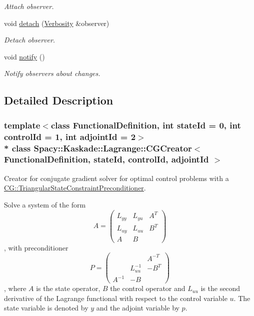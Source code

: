 \begin{DoxyCompactItemize}
\begin{DoxyCompactList}\small\item\em Attach observer. \end{DoxyCompactList}\item 
void \hyperlink{classSpacy_1_1Mixin_1_1MixinConnection_adda739590c487679c26f60e50aedb73f}{detach} (\hyperlink{classSpacy_1_1Mixin_1_1Verbosity_aefe2f237b0456c4bced001fbfa75f92e}{Verbosity} \&observer)\hypertarget{classSpacy_1_1Mixin_1_1MixinConnection_adda739590c487679c26f60e50aedb73f}{}\label{classSpacy_1_1Mixin_1_1MixinConnection_adda739590c487679c26f60e50aedb73f}

\begin{DoxyCompactList}\small\item\em Detach observer. \end{DoxyCompactList}\item 
void \hyperlink{classSpacy_1_1Mixin_1_1MixinConnection_a1ddeaa78a3bb4a38c2cca36d1f99fe36}{notify} ()\hypertarget{classSpacy_1_1Mixin_1_1MixinConnection_a1ddeaa78a3bb4a38c2cca36d1f99fe36}{}\label{classSpacy_1_1Mixin_1_1MixinConnection_a1ddeaa78a3bb4a38c2cca36d1f99fe36}

\begin{DoxyCompactList}\small\item\em Notify observers about changes. \end{DoxyCompactList}\end{DoxyCompactItemize}


\subsection{Detailed Description}
\subsubsection*{template$<$class Functional\+Definition, int state\+Id = 0, int control\+Id = 1, int adjoint\+Id = 2$>$\\*
class Spacy\+::\+Kaskade\+::\+Lagrange\+::\+C\+G\+Creator$<$ Functional\+Definition, state\+Id, control\+Id, adjoint\+Id $>$}

Creator for conjugate gradient solver for optimal control problems with a \hyperlink{classSpacy_1_1CG_1_1TriangularStateConstraintPreconditioner}{C\+G\+::\+Triangular\+State\+Constraint\+Preconditioner}. 

Solve a system of the form \[ A = \left( \begin{array}{ccc} L_{yy} & L_{yu} & A^T \\ L_{uy} & L_{uu} & B^T \\ A & B & \end{array} \right)\], with preconditioner \[ P = \left( \begin{array}{ccc} & & A^{-T} \\ & L_{uu}^{-1} & -B^T \\ A^{-1} & -B & \end{array} \right)\], where $A$ is the state operator, $B$ the control operator and $L_{uu}$ is the second derivative of the Lagrange functional with respect to the control variable $u$. The state variable is denoted by $y$ and the adjoint variable by $p$.


